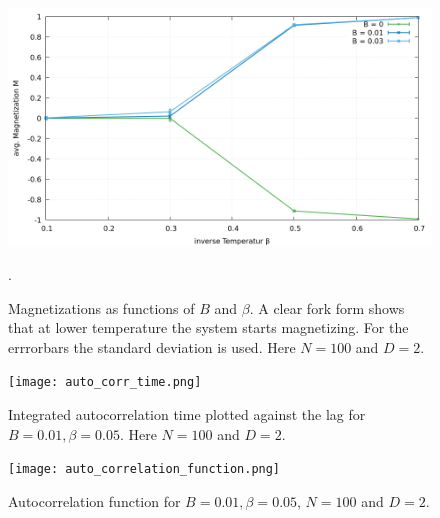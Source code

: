 \documentclass[11pt,a4paper]{article}
\begin{document}
\begin{figure}
\centering
\includegraphics[scale=0.65]{magnet_beta.png}
\caption{Magnetizations as functions of $B$ and $\beta$. A clear fork form shows that at lower temperature the system starts magnetizing. For the errrorbars the standard deviation is used. Here $N = 100$ and $D = 2$.}.
\label{fig:foo70}
\end{figure}
\begin{figure}
\centering
\texttt{[image: auto\_corr\_time.png]}
\caption{Integrated autocorrelation time plotted against the lag for $B = 0.01, \beta = 0.05$. Here $N = 100$ and $D = 2$.}
\label{fig:foo70}
\end{figure}
\begin{figure}
\centering
\texttt{[image: auto\_correlation\_function.png]}
\caption{Autocorrelation function for $B = 0.01, \beta = 0.05$, $N = 100$ and $D = 2$.}
\label{fig:foo32}
\end{figure}
\end{document}
